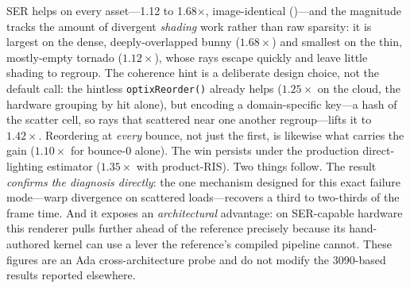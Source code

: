 SER helps on every asset---\num{1.12} to \num{1.68}$\times$, image-identical ()---and the
magnitude tracks the amount of divergent \emph{shading} work rather than raw sparsity: it is largest on
the dense, deeply-overlapped bunny ($1.68\times$) and smallest on the thin, mostly-empty tornado
($1.12\times$), whose rays escape quickly and leave little shading to regroup. The coherence
hint is a deliberate design choice, not the default call: the hintless \texttt{optixReorder()} already
helps ($1.25\times$ on the cloud, the hardware grouping by hit alone), but encoding a domain-specific
key---a hash of the scatter cell, so rays that scattered near one another regroup---lifts it to
$1.42\times$. Reordering at \emph{every} bounce, not just the first, is likewise what carries the gain
($1.10\times$ for bounce-0 alone). The win persists under the production direct-lighting estimator
($1.35\times$ with product-RIS). Two things follow. The result \emph{confirms the
 diagnosis directly}: the one mechanism designed for this exact failure mode---warp
divergence on scattered loads---recovers a third to two-thirds of the frame time. And it exposes an
\emph{architectural} advantage: on SER-capable hardware this renderer pulls further ahead of the
reference precisely because its hand-authored kernel can use a lever the reference's compiled pipeline
cannot. These figures are an Ada cross-architecture probe and do not modify the 3090-based results
reported elsewhere.

